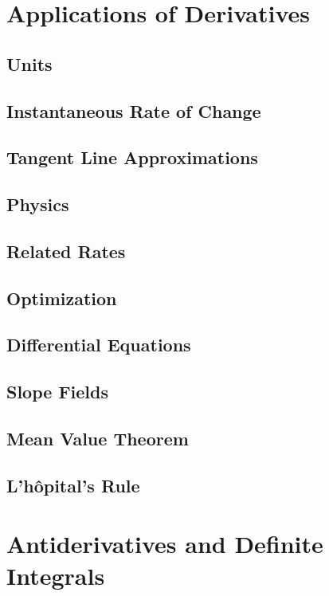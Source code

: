 \documentclass{article}
\begin{document}
\section{Applications of Derivatives}
\subsection{Units}
\subsection{Instantaneous Rate of Change}
\subsection{Tangent Line Approximations}
\subsection{Physics}
\subsection{Related Rates}
\subsection{Optimization}
\subsection{Differential Equations}
\subsection{Slope Fields}\newpage
\subsection{Mean Value Theorem}
\subsection{L'h\^{o}pital's Rule}
\newpage
\section{Antiderivatives and Definite Integrals}
\end{document}
